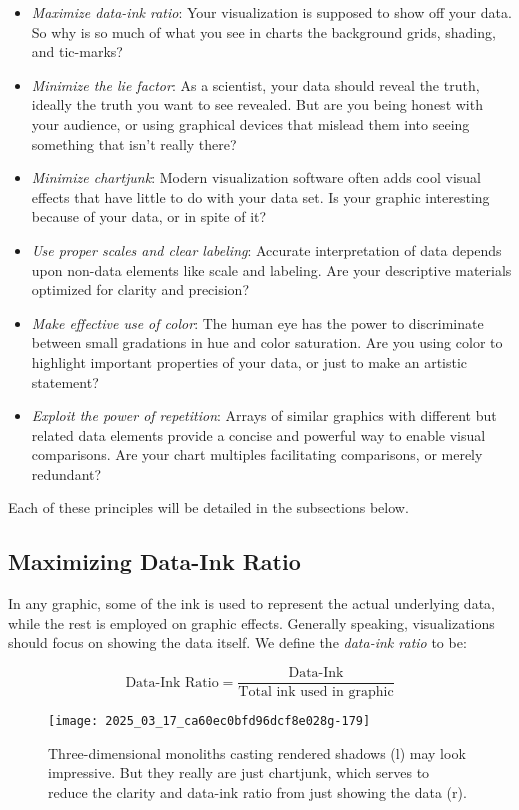 \documentclass[10pt]{article}
\begin{document}
\begin{itemize}
  \item \emph{Maximize data-ink ratio}: Your visualization is supposed to show off your data. So why is so much of what you see in charts the background grids, shading, and tic-marks?
  \item \emph{Minimize the lie factor}: As a scientist, your data should reveal the truth, ideally the truth you want to see revealed. But are you being honest with your audience, or using graphical devices that mislead them into seeing something that isn’t really there?
  \item \emph{Minimize chartjunk}: Modern visualization software often adds cool visual effects that have little to do with your data set. Is your graphic interesting because of your data, or in spite of it?
  \item \emph{Use proper scales and clear labeling}: Accurate interpretation of data depends upon non-data elements like scale and labeling. Are your descriptive materials optimized for clarity and precision?
  \item \emph{Make effective use of color}: The human eye has the power to discriminate between small gradations in hue and color saturation. Are you using color to highlight important properties of your data, or just to make an artistic statement?
  \item \emph{Exploit the power of repetition}: Arrays of similar graphics with different but related data elements provide a concise and powerful way to enable visual comparisons. Are your chart multiples facilitating comparisons, or merely redundant?
\end{itemize}

Each of these principles will be detailed in the subsections below.

\subsection{Maximizing Data-Ink Ratio}

In any graphic, some of the ink is used to represent the actual underlying data, while the rest is employed on graphic effects. Generally speaking, visualizations should focus on showing the data itself. We define the \emph{data-ink ratio} to be:

\[
\text{Data-Ink Ratio} = \frac{\text{Data-Ink}}{\text{Total ink used in graphic}}
\]

\begin{figure}[h]
    \centering
    \texttt{[image: 2025\_03\_17\_ca60ec0bfd96dcf8e028g-179]}
    \caption{Three-dimensional monoliths casting rendered shadows (l) may look impressive. But they really are just chartjunk, which serves to reduce the clarity and data-ink ratio from just showing the data (r).}
\end{figure}
\end{document}
